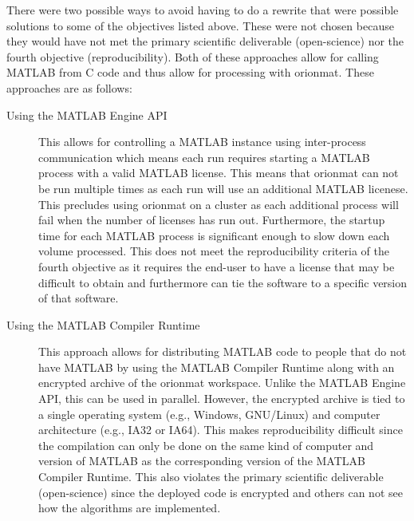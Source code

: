 There were two possible ways to avoid having to do a rewrite that
were possible solutions to some of the objectives listed above.
These were not chosen because they would have not met the primary
scientific deliverable (open-science) nor the fourth objective
(reproducibility). Both of these approaches allow for calling
MATLAB from C code and thus allow for processing with
\gls{orionmat}. These approaches are as follows:
\begin{description}
\item[Using the MATLAB Engine API] This allows for controlling a
	MATLAB instance using inter-process communication which
	means each run requires starting a MATLAB process with a
	valid MATLAB license. This means that \gls{orionmat}
	can not be run multiple times as each run will use an
	additional MATLAB licenese. This precludes using
	\gls{orionmat} on a cluster as each additional process
	will fail when the number of licenses has run out.
	Furthermore, the startup time for each MATLAB process is
	significant enough to slow down each volume processed.
	This does not meet the reproducibility criteria of the
	fourth objective as it requires the end-user to have a
	license that may be difficult to obtain and furthermore
	can tie the software to a specific version of that
	software.
\item[Using the MATLAB Compiler Runtime] This approach allows for
	distributing MATLAB code to people that do not have
	MATLAB by using the MATLAB Compiler Runtime along with an
	encrypted archive of the \gls{orionmat} workspace. Unlike
	the MATLAB Engine API, this can be used in parallel.
	However, the encrypted archive is tied to a single
	operating system (e.g., Windows, GNU/Linux) and computer
	architecture (e.g., IA32 or IA64). This makes
	reproducibility difficult since the compilation can only
	be done on the same kind of computer and version of MATLAB
	as the corresponding version of the MATLAB Compiler
	Runtime. This also violates the primary
	scientific deliverable (open-science) since the deployed
	code is encrypted and others can not see how the
	algorithms are implemented.
\end{description}
